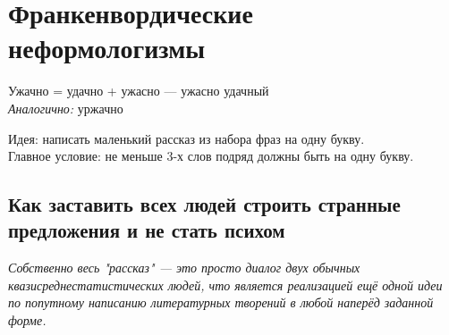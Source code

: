 \section{Франкенвордические неформологизмы}

Ужачно = удачно + ужасно --- ужасно удачный\\

\emph{Аналогично:} уржачно


Идея: написать маленький рассказ из набора фраз на одну букву.\\
Главное условие: не меньше 3-х слов подряд должны быть на одну букву.

\subsection{Как заставить всех людей строить странные предложения и не стать психом}
\emph{Собственно весь "рассказ" --- это просто диалог двух обычных квазисреднестатистических людей, что является реализацией ещё одной идеи по
попутному написанию литературных творений в любой наперёд заданной форме.}


